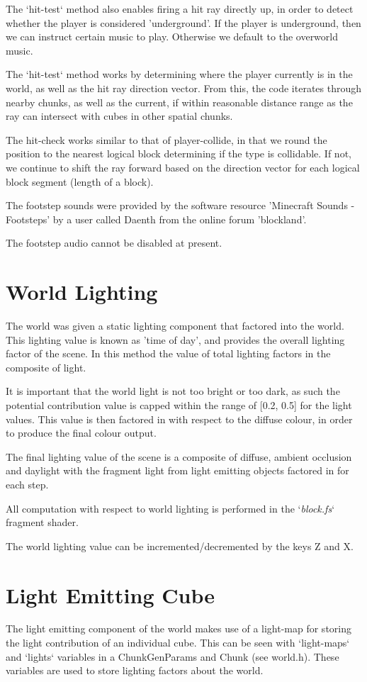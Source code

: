 \documentclass{book}
\begin{document}
The `hit-test` method also enables firing a hit ray directly up, in order to detect whether the player is considered 'underground'.  If the player is underground, then we can instruct certain music to play.  Otherwise we default to the overworld music.
    
The `hit-test` method works by determining where the player currently is in the world, as well as the hit ray direction vector.  From this, the code iterates through nearby chunks, as well as the current, if within reasonable distance range as the ray can intersect with cubes in other spatial chunks.
    
The hit-check works similar to that of player-collide, in that we round the position to the nearest logical block determining if the type is collidable.  If not, we continue to shift the ray forward based on the direction vector for each logical block segment (length of a block).
    
The footstep sounds were provided by the software resource 'Minecraft Sounds - Footsteps' by a user called Daenth from the online forum 'blockland'.
    
The footstep audio cannot be disabled at present.
    
\section{World Lighting}
The world was given a static lighting component that factored into the world.  This lighting value is known as 'time of day', and provides the overall lighting factor of the scene.  In this method the value of total lighting factors in the composite of light.
    
It is important that the world light is not too bright or too dark, as such the potential contribution value is capped within the range of [0.2, 0.5] for the light values.  This value is then factored in with respect to the diffuse colour, in order to produce the final colour output.
    
The final lighting value of the scene is a composite of diffuse, ambient occlusion and daylight with the fragment light from light emitting objects factored in for each step. 
    
All computation with respect to world lighting is performed in the `\textit{block.fs}` fragment shader.  
    
The world lighting value can be incremented/decremented by the keys Z and X.
    
\section{Light Emitting Cube}
The light emitting component of the world makes use of a light-map for storing the light contribution of an individual cube.  This can be seen with `light-maps` and `lights` variables in a ChunkGenParams and Chunk (see world.h).  These variables are used to store lighting factors about the world.
    
\end{document}
